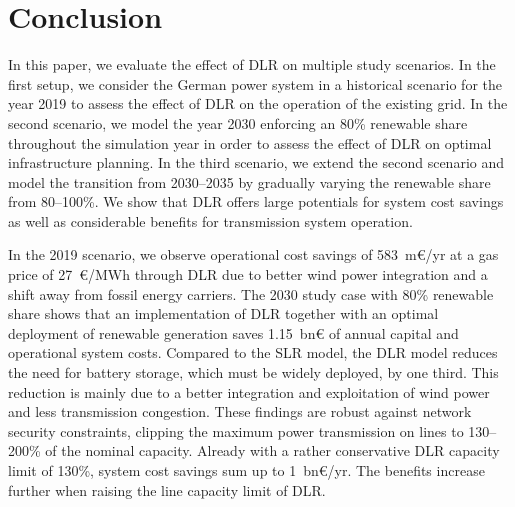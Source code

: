 \documentclass[preprint,12pt]{elsarticle}
\begin{document}


\section{Conclusion}
\label{sec:conclusion}
In this paper, we evaluate the effect of DLR on multiple study scenarios. In the first setup, we consider the German power system in a historical scenario for the year 2019 to assess the effect of DLR on the operation of the existing grid. In the second scenario, we model the year 2030 enforcing an 80\% renewable share throughout the simulation year in order to assess the effect of DLR on optimal infrastructure planning. In the third scenario, we extend the second scenario and model the transition from 2030--2035 by gradually varying the renewable share from 80--100\%. We show that DLR offers large potentials for system cost savings as well as considerable benefits for transmission system operation.

In the 2019 scenario, we observe operational cost savings of 583~m\euro{}/yr at a gas price of 27~\euro{}/MWh through DLR due to better wind power integration and a shift away from fossil energy carriers. The 2030 study case with 80\% renewable share shows that an implementation of DLR together with an optimal deployment of renewable generation saves 1.15~bn\euro{} of annual capital and operational system costs. Compared to the SLR model, the DLR model reduces the need for battery storage, which must be widely deployed, by one third. This reduction is mainly due to a better integration and exploitation of wind power and less transmission congestion. These findings are robust against network security constraints, clipping the maximum power transmission on lines to 130--200\% of the nominal capacity. Already with a rather conservative DLR capacity limit of 130\%, system cost savings sum up to 1~bn\euro{}/yr. The benefits increase further when raising the line capacity limit of DLR.
\end{document}
